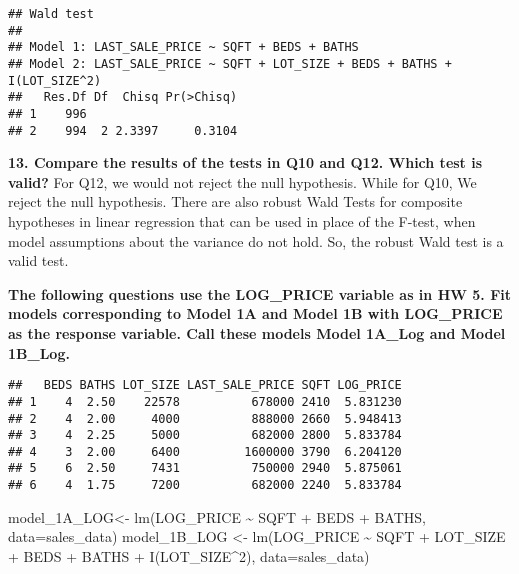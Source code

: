 \documentclass[
]{article}
\newenvironment{Shaded}{\begin{snugshade}}{\end{snugshade}}
\newcommand{\AttributeTok}[1]{\textcolor[rgb]{0.77,0.63,0.00}{#1}}
\newcommand{\DecValTok}[1]{\textcolor[rgb]{0.00,0.00,0.81}{#1}}
\newcommand{\FunctionTok}[1]{\textcolor[rgb]{0.00,0.00,0.00}{#1}}
\newcommand{\NormalTok}[1]{#1}
\newcommand{\OtherTok}[1]{\textcolor[rgb]{0.56,0.35,0.01}{#1}}
\newcommand{\SpecialCharTok}[1]{\textcolor[rgb]{0.00,0.00,0.00}{#1}}
\begin{document}
\begin{verbatim}
## Wald test
## 
## Model 1: LAST_SALE_PRICE ~ SQFT + BEDS + BATHS
## Model 2: LAST_SALE_PRICE ~ SQFT + LOT_SIZE + BEDS + BATHS + I(LOT_SIZE^2)
##   Res.Df Df  Chisq Pr(>Chisq)
## 1    996                     
## 2    994  2 2.3397     0.3104
\end{verbatim}

\textbf{13. Compare the results of the tests in Q10 and Q12. Which test
is valid?} For Q12, we would not reject the null hypothesis. While for
Q10, We reject the null hypothesis. There are also robust Wald Tests for
composite hypotheses in linear regression that can be used in place of
the F-test, when model assumptions about the variance do not hold. So,
the robust Wald test is a valid test.

\textbf{The following questions use the LOG\_PRICE variable as in HW 5.
Fit models corresponding to Model 1A and Model 1B with LOG\_PRICE as the
response variable. Call these models Model 1A\_Log and Model 1B\_Log.}

\begin{Shaded}
\end{Shaded}

\begin{verbatim}
##   BEDS BATHS LOT_SIZE LAST_SALE_PRICE SQFT LOG_PRICE
## 1    4  2.50    22578          678000 2410  5.831230
## 2    4  2.00     4000          888000 2660  5.948413
## 3    4  2.25     5000          682000 2800  5.833784
## 4    3  2.00     6400         1600000 3790  6.204120
## 5    6  2.50     7431          750000 2940  5.875061
## 6    4  1.75     7200          682000 2240  5.833784
\end{verbatim}

\begin{Shaded}
\begin{Highlighting}[]
\NormalTok{model\_1A\_LOG}\OtherTok{\textless{}{-}} \FunctionTok{lm}\NormalTok{(LOG\_PRICE }\SpecialCharTok{\textasciitilde{}}\NormalTok{ SQFT }\SpecialCharTok{+}\NormalTok{ BEDS }\SpecialCharTok{+}\NormalTok{ BATHS, }\AttributeTok{data=}\NormalTok{sales\_data)}
\NormalTok{model\_1B\_LOG }\OtherTok{\textless{}{-}} \FunctionTok{lm}\NormalTok{(LOG\_PRICE }\SpecialCharTok{\textasciitilde{}}\NormalTok{ SQFT }\SpecialCharTok{+}\NormalTok{ LOT\_SIZE }\SpecialCharTok{+}\NormalTok{  BEDS }\SpecialCharTok{+}\NormalTok{ BATHS }\SpecialCharTok{+} \FunctionTok{I}\NormalTok{(LOT\_SIZE}\SpecialCharTok{\^{}}\DecValTok{2}\NormalTok{), }\AttributeTok{data=}\NormalTok{sales\_data)}
\end{Highlighting}
\end{Shaded}
\end{document}

